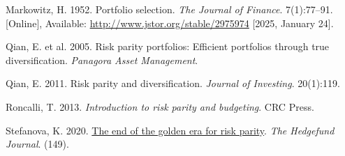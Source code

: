 \documentclass[11pt,preprint]{elsarticle}
\numberwithin{equation}{section}
\numberwithin{figure}{section}
\numberwithin{table}{section}
\newlength{\cslhangindent}
\newenvironment{CSLReferences}[2] %
{\begin{list}{}{%
	\setlength{\itemindent}{0pt}
	\setlength{\leftmargin}{0pt}
	\setlength{\parsep}{0pt}
	\ifodd #1
	\setlength{\leftmargin}{\cslhangindent}
	\setlength{\itemindent}{-1\cslhangindent}
	\fi
	\setlength{\itemsep}{#2\baselineskip}}}
{\end{list}}
\begin{document}
\begin{CSLReferences}{1}{1}
Markowitz, H. 1952. Portfolio selection. \emph{The Journal of Finance}.
7(1):77--91. {[}Online{]}, Available:
\url{http://www.jstor.org/stable/2975974} {[}2025, January 24{]}.

Qian, E. et al. 2005. Risk parity portfolios: Efficient portfolios
through true diversification. \emph{Panagora Asset Management}.

Qian, E. 2011. Risk parity and diversification. \emph{Journal of
Investing}. 20(1):119.

Roncalli, T. 2013. \emph{Introduction to risk parity and budgeting}. CRC
Press.

Stefanova, K. 2020. \href{}{{The end of the golden era for risk
parity}}. \emph{The Hedgefund Journal}. (149).

\end{CSLReferences}


\end{document}
